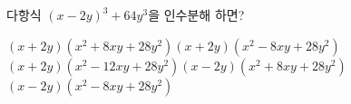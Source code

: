 다항식 $(x-2y)^3+64y^3$을 인수분해 하면?
\begin{choicesv}{$(x+2y)(x^2+8xy+28y^2)$}{$(x+2y)(x^2-8xy+28y^2)$}{$(x+2y)(x^2-12xy+28y^2)$}{$(x-2y)(x^2+8xy+28y^2)$}{$(x-2y)(x^2-8xy+28y^2)$}\end{choicesv}
